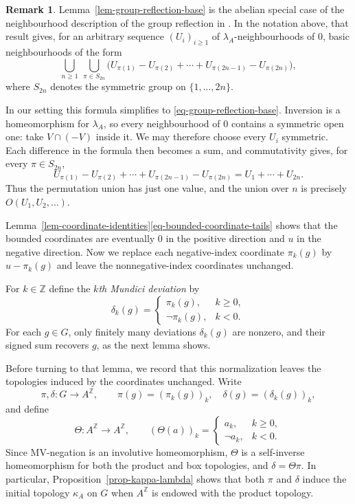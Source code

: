 \documentclass[preprint,3p]{elsarticle}
\theoremstyle{plain}
\theoremstyle{definition}
\newtheorem{rem}[thm]{Remark}
\numberwithin{equation}{section}
\begin{document}
\begin{rem}
\label{rem-group-reflection-Tkachenko}
Lemma~\ref{lem-group-reflection-base} is the abelian special case of
the neighbourhood description of the group reflection in
\cite[Lemma~11]{Tkachenko2013}.  In the notation above, that result gives, 
for an arbitrary sequence $(U_i)_{i\geq1}$ of $\lambda_A$-neighbourhoods of $0$, 
basic neighbourhoods of the form
\[
 \bigcup_{n\geq1}\ \bigcup_{\pi\in S_{2n}}
 \bigl(
 U_{\pi(1)}-U_{\pi(2)}+\cdots+
 U_{\pi(2n-1)}-U_{\pi(2n)}
 \bigr),
\]
where $S_{2n}$ denotes the symmetric group on
$\{1,\ldots,2n\}$.

In our setting this formula simplifies to
\eqref{eq-group-reflection-base}.
Inversion is a homeomorphism for $\lambda_A$, so every
neighbourhood of $0$ contains a symmetric open one: take
$V\cap(-V)$ inside it.  We may therefore choose every $U_i$
symmetric.  Each difference in the formula then becomes a sum,
and commutativity gives, for every $\pi\in S_{2n}$,
\[
 U_{\pi(1)}-U_{\pi(2)}+\cdots+
 U_{\pi(2n-1)}-U_{\pi(2n)}
 =U_1+\cdots+U_{2n}.
\]
Thus the permutation union has just one value, and the union over
$n$ is precisely $O(U_1,U_2,\ldots)$.
\end{rem}

Lemma~\ref{lem-coordinate-identities}\ref{eq-bounded-coordinate-tails} 
shows that the bounded
coordinates are eventually $0$ in the positive direction and $u$ in
the negative direction.
Now we replace each negative-index coordinate $\pi_k(g)$ by
$u-\pi_k(g)$ and leave the nonnegative-index coordinates unchanged.

For $k\in\mathbb Z$ define the \emph{$k$th Mundici deviation} by
\begin{equation}
\label{eq-Mundici-deviation}
 \delta_k(g)=
 \begin{cases}
  \pi_k(g),&k\geq0,\\
  \neg\pi_k(g),&k<0.
 \end{cases}
\end{equation}
For each $g\in G$, only finitely many deviations $\delta_k(g)$ are
nonzero, and their signed sum recovers $g$, as the next lemma shows.

Before turning to that lemma, we record that this normalization
leaves the topologies induced by the coordinates unchanged.  Write
\[
 \pi,\delta\colon G\longrightarrow A^{\mathbb Z},
 \qquad
 \pi(g)=(\pi_k(g))_k,\quad \delta(g)=(\delta_k(g))_k,
\]
and define
\begin{equation}
\label{eq-coordinate-negation-homeomorphism}
 \Theta\colon A^{\mathbb Z}\longrightarrow A^{\mathbb Z},
 \qquad
 (\Theta(a))_k=
 \begin{cases}
  a_k,&k\geq0,\\
  \neg a_k,&k<0.
 \end{cases}
\end{equation}
Since MV-negation is an involutive homeomorphism, $\Theta$ is a
self-inverse homeomorphism for both the product and box topologies,
and $\delta=\Theta\pi$.  In particular,
Proposition~\ref{prop-kappa-lambda} shows that both $\pi$ and $\delta$
induce the initial topology $\kappa_A$ on $G$ when $A^{\mathbb Z}$
is endowed with the product topology.
\end{document}
